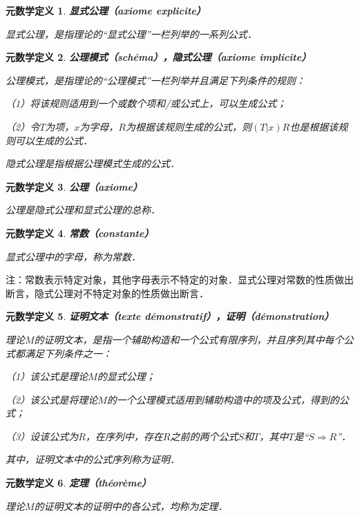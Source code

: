 \documentclass[12pt, a4paper, oneside]{book}
\newtheorem{metadef}{元数学定义}
\begin{document}
			\begin{metadef}
				\textbf{显式公理（axiome explicite）}
				\par
				显式公理，是指理论的“显式公理”一栏列举的一系列公式．
			\end{metadef}

			\begin{metadef}
				\textbf{公理模式（schéma），隐式公理（axiome implicite）}
				\par
				公理模式，是指理论的“公理模式”一栏列举并且满足下列条件的规则：
				\par
				（1）将该规则适用到一个或数个项和/或公式上，可以生成公式；
				\par
				（2）令$T$为项，$x$为字母，$R$为根据该规则生成的公式，则$(T|x)R$也是根据该规则可以生成的公式．
				\par
				隐式公理是指根据公理模式生成的公式．
			\end{metadef}

			\begin{metadef}
				\textbf{公理（axiome）}
				\par
				公理是隐式公理和显式公理的总称．
			\end{metadef}

			\begin{metadef}
				\textbf{常数（constante）}
				\par
				显式公理中的字母，称为常数．
			\end{metadef}
			注：常数表示特定对象，其他字母表示不特定的对象．显式公理对常数的性质做出断言，隐式公理对不特定对象的性质做出断言．

			\begin{metadef}
				\textbf{证明文本（texte démonstratif），证明（démonstration）}
				\par
				理论$M$的证明文本，是指一个辅助构造和一个公式有限序列，并且序列其中每个公式都满足下列条件之一：
				\par
				（1）该公式是理论$M$的显式公理；
				\par
				（2）该公式是将理论$M$的一个公理模式适用到辅助构造中的项及公式，得到的公式；
				\par
				（3）设该公式为$R$，在序列中，存在$R$之前的两个公式$S$和$T$，其中$T$是“$S\Rightarrow R$”．
				\par
				其中，证明文本中的公式序列称为证明．
			\end{metadef}

			\begin{metadef}
				\textbf{定理（théorème）}
				\par
				理论$M$的证明文本的证明中的各公式，均称为定理．
			\end{metadef}
\end{document}

